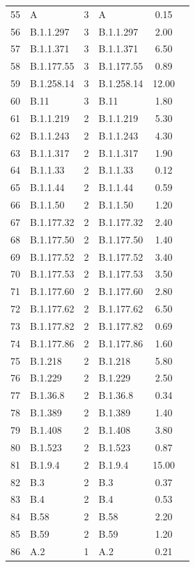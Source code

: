 \documentclass[9pt,twoside,lineno]{pnas-new}
\begin{document}
\begin{longtable}{llcp{4cm}cc}
  55 & A &   3 & A & 0.15 \\ 
  56 & B.1.1.297 &   3 & B.1.1.297 & 2.00 \\ 
  57 & B.1.1.371 &   3 & B.1.1.371 & 6.50 \\ 
  58 & B.1.177.55 &   3 & B.1.177.55 & 0.89 \\ 
  59 & B.1.258.14 &   3 & B.1.258.14 & 12.00 \\ 
  60 & B.11 &   3 & B.11 & 1.80 \\ 
  61 & B.1.1.219 &   2 & B.1.1.219 & 5.30 \\ 
  62 & B.1.1.243 &   2 & B.1.1.243 & 4.30 \\ 
  63 & B.1.1.317 &   2 & B.1.1.317 & 1.90 \\ 
  64 & B.1.1.33 &   2 & B.1.1.33 & 0.12 \\ 
  65 & B.1.1.44 &   2 & B.1.1.44 & 0.59 \\ 
  66 & B.1.1.50 &   2 & B.1.1.50 & 1.20 \\ 
  67 & B.1.177.32 &   2 & B.1.177.32 & 2.40 \\ 
  68 & B.1.177.50 &   2 & B.1.177.50 & 1.40 \\ 
  69 & B.1.177.52 &   2 & B.1.177.52 & 3.40 \\ 
  70 & B.1.177.53 &   2 & B.1.177.53 & 3.50 \\ 
  71 & B.1.177.60 &   2 & B.1.177.60 & 2.80 \\ 
  72 & B.1.177.62 &   2 & B.1.177.62 & 6.50 \\ 
  73 & B.1.177.82 &   2 & B.1.177.82 & 0.69 \\ 
  74 & B.1.177.86 &   2 & B.1.177.86 & 1.60 \\ 
  75 & B.1.218 &   2 & B.1.218 & 5.80 \\ 
  76 & B.1.229 &   2 & B.1.229 & 2.50 \\ 
  77 & B.1.36.8 &   2 & B.1.36.8 & 0.34 \\ 
  78 & B.1.389 &   2 & B.1.389 & 1.40 \\ 
  79 & B.1.408 &   2 & B.1.408 & 3.80 \\ 
  80 & B.1.523 &   2 & B.1.523 & 0.87 \\ 
  81 & B.1.9.4 &   2 & B.1.9.4 & 15.00 \\ 
  82 & B.3 &   2 & B.3 & 0.37 \\ 
  83 & B.4 &   2 & B.4 & 0.53 \\ 
  84 & B.58 &   2 & B.58 & 2.20 \\ 
  85 & B.59 &   2 & B.59 & 1.20 \\ 
  86 & A.2 &   1 & A.2 & 0.21 \\ 

\end{longtable}
\end{document}
